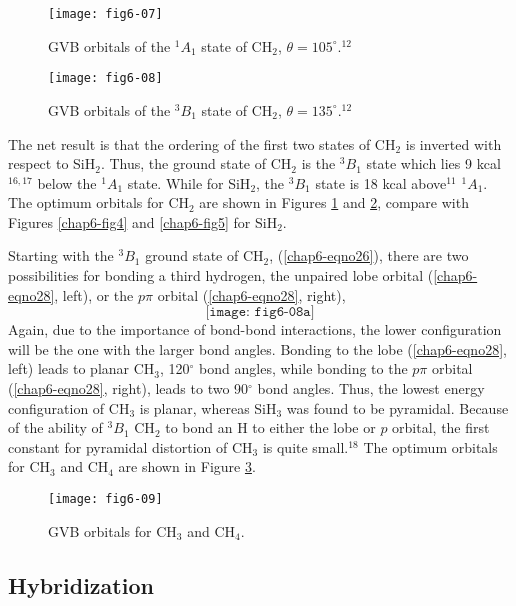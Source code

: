 \begin{figure}
\texttt{[image: fig6-07]}
\caption{GVB orbitals of the ${^1A}_1$ state of CH$_2$, 
$\theta = 105^{\circ}$.$^{12}$ }
\label{chap6-fig8}
\end{figure}

\begin{figure}
\texttt{[image: fig6-08]}
\caption{GVB orbitals of the ${^3B}_1$ state of CH$_2$,
$\theta = 135^{\circ}$.$^{12}$}
\label{chap6-fig9}
\end{figure}

The net result is that the ordering of the first two states of CH$_2$
is inverted with respect to SiH$_2$.  Thus, the ground state of CH$_2$
is the ${^3B}_1$ state which lies 9 kcal$^{16,17}$ below the ${^1A}_1$
state.  While for SiH$_2$, the ${^3B}_1$ state is 18 kcal above$^{11}$
${^1A}_1$.  The optimum orbitals for CH$_2$ are shown in Figures 
\ref{chap6-fig8} and \ref{chap6-fig9}, compare with Figures 
\ref{chap6-fig4} and \ref{chap6-fig5} for SiH$_2$.  

Starting with the ${^3B}_1$ ground state of CH$_2$,
(\ref{chap6-eqno26}), there are two possibilities for bonding a third
hydrogen, the unpaired lobe orbital (\ref{chap6-eqno28}, left), or the
$p \pi$ orbital (\ref{chap6-eqno28}, right),
\begin{equation}
\texttt{[image: fig6-08a]}
\label{chap6-eqno28}
\end{equation}
Again, due to the importance of bond-bond interactions, the lower
configuration will be the one with the larger bond angles.  Bonding to
the lobe (\ref{chap6-eqno28}, left) leads to planar CH$_3$,
120$^{\circ}$ bond angles, while bonding to the $p \pi$ orbital
(\ref{chap6-eqno28}, right), leads to two 90$^{\circ}$ bond angles.
Thus, the lowest energy configuration of CH$_3$ is planar, whereas
SiH$_3$ was found to be pyramidal.  Because of the ability of
${^3B}_1$ CH$_2$ to bond an H to either the lobe or $p$ orbital, the
first constant for pyramidal distortion of CH$_3$ is quite
small.$^{18}$ The optimum orbitals for CH$_3$ and CH$_4$ are shown in
Figure \ref{chap6-fig10}.


\begin{figure}
\texttt{[image: fig6-09]}
\caption{GVB orbitals for CH$_3$ and CH$_4$.}
\label{chap6-fig10}
\end{figure}

\subsection{Hybridization}

